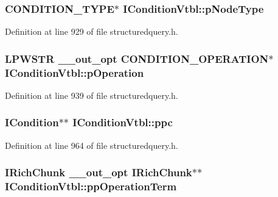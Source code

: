 \subsubsection[{\texorpdfstring{p\+Node\+Type}{pNodeType}}]{ {\bf C\+O\+N\+D\+I\+T\+I\+O\+N\+\_\+\+T\+Y\+PE}$\ast$ I\+Condition\+Vtbl\+::p\+Node\+Type}\hypertarget{struct_i_condition_vtbl_a3d64a605f03702dbbe7c5d4903f6d0cc}{}\label{struct_i_condition_vtbl_a3d64a605f03702dbbe7c5d4903f6d0cc}


Definition at line 929 of file structuredquery.\+h.

\subsubsection[{\texorpdfstring{p\+Operation}{pOperation}}]{ {\bf L\+P\+W\+S\+TR} {\bf \+\_\+\+\_\+out\+\_\+opt} {\bf C\+O\+N\+D\+I\+T\+I\+O\+N\+\_\+\+O\+P\+E\+R\+A\+T\+I\+ON}$\ast$ I\+Condition\+Vtbl\+::p\+Operation}\hypertarget{struct_i_condition_vtbl_ae54822e1485cc73440327a0c4a86ac1b}{}\label{struct_i_condition_vtbl_ae54822e1485cc73440327a0c4a86ac1b}


Definition at line 939 of file structuredquery.\+h.

\subsubsection[{\texorpdfstring{ppc}{ppc}}]{ {\bf I\+Condition}$\ast$$\ast$ I\+Condition\+Vtbl\+::ppc}\hypertarget{struct_i_condition_vtbl_a4a9023600efc19652dca5a17076b24a1}{}\label{struct_i_condition_vtbl_a4a9023600efc19652dca5a17076b24a1}


Definition at line 964 of file structuredquery.\+h.

\subsubsection[{\texorpdfstring{pp\+Operation\+Term}{ppOperationTerm}}]{ {\bf I\+Rich\+Chunk} {\bf \+\_\+\+\_\+out\+\_\+opt} {\bf I\+Rich\+Chunk}$\ast$$\ast$ I\+Condition\+Vtbl\+::pp\+Operation\+Term}\hypertarget{struct_i_condition_vtbl_addbc6663fb5ea0323df2d8a4eb46dc8a}{}\label{struct_i_condition_vtbl_addbc6663fb5ea0323df2d8a4eb46dc8a}


